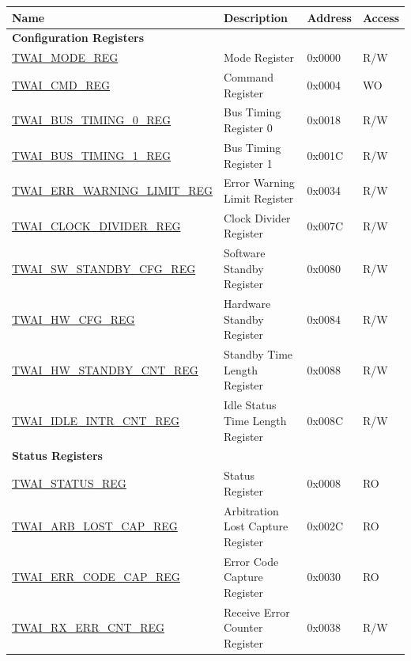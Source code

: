 \begin{longtable}{ | p{6cm} | p{6.2cm} | p{1.3cm} | p{1.5cm} | }
\hline\rowcolor{lightgray}
\textbf{Name} & \textbf{Description} &  \textbf{Address} & \textbf{Access} \\ \hline
\endhead
\multicolumn{4}{|l|}{\textbf{Configuration Registers}} \\ \hline
\hyperref[regdesc:TWAIMODEREG]{TWAI\_MODE\_REG} & Mode Register & 0x0000 & R/W \\ \hline
\hyperref[regdesc:TWAICMDREG]{TWAI\_CMD\_REG} & Command Register & 0x0004 & WO \\ \hline
\hyperref[regdesc:TWAIBUSTIMING0REG]{TWAI\_BUS\_TIMING\_0\_REG} & Bus Timing Register 0 & 0x0018 & R/W \\ \hline
\hyperref[regdesc:TWAIBUSTIMING1REG]{TWAI\_BUS\_TIMING\_1\_REG} & Bus Timing Register 1 & 0x001C & R/W \\ \hline
\hyperref[regdesc:TWAIERRWARNINGLIMITREG]{TWAI\_ERR\_WARNING\_LIMIT\_REG} & Error Warning Limit Register & 0x0034 & R/W \\ \hline
\hyperref[regdesc:TWAICLOCKDIVIDERREG]{TWAI\_CLOCK\_DIVIDER\_REG} & Clock Divider Register & 0x007C & R/W \\ \hline
\hyperref[regdesc:TWAISWSTANDBYCFGREG]{TWAI\_SW\_STANDBY\_CFG\_REG} & Software Standby Register & 0x0080 & R/W \\ \hline
\hyperref[regdesc:TWAIHWCFGREG]{TWAI\_HW\_CFG\_REG} & Hardware Standby Register & 0x0084 & R/W \\ \hline
\hyperref[regdesc:TWAIHWSTANDBYCNTREG]{TWAI\_HW\_STANDBY\_CNT\_REG} & Standby Time Length Register & 0x0088 & R/W \\ \hline
\hyperref[regdesc:TWAIIDLEINTRCNTREG]{TWAI\_IDLE\_INTR\_CNT\_REG} & Idle Status Time Length Register & 0x008C & R/W \\ \hline
\multicolumn{4}{|l|}{\textbf{Status Registers}} \\ \hline
\hyperref[regdesc:TWAISTATUSREG]{TWAI\_STATUS\_REG} & Status Register & 0x0008 & RO \\ \hline
\hyperref[regdesc:TWAIARBLOSTCAPREG]{TWAI\_ARB\_LOST\_CAP\_REG} & Arbitration Lost Capture Register & 0x002C & RO \\ \hline
\hyperref[regdesc:TWAIERRCODECAPREG]{TWAI\_ERR\_CODE\_CAP\_REG} & Error Code Capture Register & 0x0030 & RO \\ \hline
\hyperref[regdesc:TWAIRXERRCNTREG]{TWAI\_RX\_ERR\_CNT\_REG} & Receive Error Counter Register & 0x0038 & R/W \\ \hline

\end{longtable}
